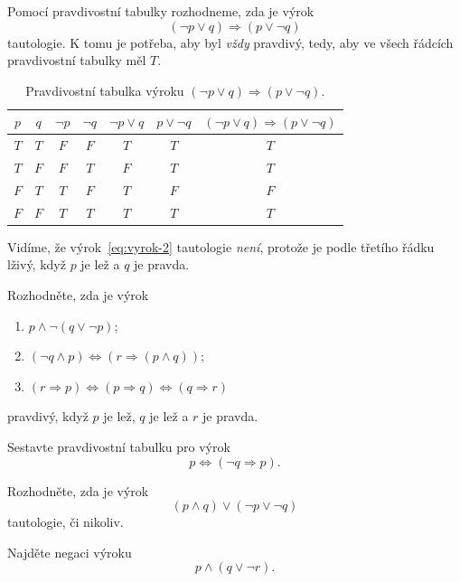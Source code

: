 \begin{example}
  \label{exam:tautologie}
  Pomocí pravdivostní tabulky rozhodneme, zda je výrok
  \begin{equation}
    \label{eq:vyrok-2}
    (\neg p \vee q) \Rightarrow (p \vee \neg q)
  \end{equation}
  tautologie. K tomu je potřeba, aby byl \emph{vždy} pravdivý, tedy, aby ve
  všech řádcích pravdivostní tabulky měl $T$.

  \begin{table}[ht]
    \centering
    \begin{tabular}{cc|ccccc}
      $p$ & $q$ & $\neg p$ & $\neg q$ & $\neg p \vee q$ & $p \vee \neg q$ &
      $(\neg p \vee q) \Rightarrow (p \vee \neg q)$\\[3pt]
      \toprule
      $T$ & $T$ & $F$ & $F$ & $T$ & $T$ & $T$\\
      $T$ & $F$ & $F$ & $T$ & $F$ & $T$ & $T$\\
      $F$ & $T$ & $T$ & $F$ & $T$ & $F$ & $F$\\
      $F$ & $F$ & $T$ & $T$ & $T$ & $T$ & $T$\\
      \bottomrule
    \end{tabular}
    \caption{Pravdivostní tabulka výroku $(\neg p \vee q) \Rightarrow (p \vee
    \neg q)$.}
    \label{table:pravdivostni-tabulka-2}
  \end{table}

  Vidíme, že výrok~\eqref{eq:vyrok-2} tautologie \emph{není}, protože je podle
  třetího řádku  lživý, když $p$ je
  lež a $q$ je pravda.
\end{example}
\begin{exercise}
  Rozhodněte, zda je výrok
  \begin{enumerate}
    \item $p \wedge \neg (q \vee \neg p)$;
    \item $(\neg q \wedge p) \Leftrightarrow (r \Rightarrow (p \wedge q))$;
    \item $(r \Rightarrow p) \Leftrightarrow (p \Rightarrow q) \Leftrightarrow
      (q \Rightarrow r)$
  \end{enumerate}
  pravdivý, když $p$ je lež, $q$ je lež a $r$ je pravda.
\end{exercise}
\lessboxspace
\begin{exercise}
  Sestavte pravdivostní tabulku pro výrok
  \[
    p \Leftrightarrow (\neg q \Rightarrow p).
  \]
\end{exercise}
\lessboxspace
\begin{exercise}
  Rozhodněte, zda je výrok
  \[
    (p \wedge q) \vee (\neg p \vee \neg q)
  \]
  tautologie, či nikoliv.
\end{exercise}
\begin{exercise}
  Najděte negaci výroku
  \[
    p \wedge (q \vee \neg r).
  \]
\end{exercise}

